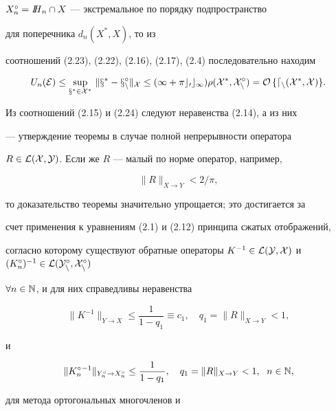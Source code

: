 $X_n^\circ =\text{\it I\/}\hspace{-1.25mm}\text{\it H\/}_n\cap X$ --- экстремальное по порядку подпространство


для поперечника $d_n(X^*,X)$, то из


соотношений (2.23), (2.22), (2.16), (2.17), (2.4) последовательно находим


\begin{equation}


U_n(\cal E)\leq \sup_{x^*\in X^*}\, \|x^*-x_n^\circ\|_X \leq


(1+\pi c_0c_1)\rho(X^*,X_n^\circ )=


O\, \{ d_n(X^*,X)\}.


\end{equation}





Из соотношений (2.15) и (2.24) следуют неравенства (2.14), а из них


--- утверждение теоремы в случае полной непрерывности оператора


$R\in \cal L(X,Y)$. Если же $R$ --- малый по норме оператор, например,


$$


\|R\|_{X\rightarrow Y}<2/\pi ,


$$


то доказательство теоремы значительно упрощается; это достигается за


счет применения к уравнениям (2.1) и (2.12) принципа сжатых отображений,


согласно которому существуют обратные операторы $K^{-1}


\in \cal L(Y,X)$ и $(K_n^\circ )^{-1}\in \cal L


(Y_n^\circ ,X_n^\circ)$


$\forall n\in \Bbb N$, и для них справедливы неравенства


$$


\|K^{-1}\|_{Y\rightarrow X}\leq\frac{1}{1-q_1}\equiv c_1,\quad


q_1=\|R\|_{X\rightarrow Y}<1 ,


$$


и


$$


\|K_n^\circ {}^{-1}\|_{Y_n^\circ\rightarrow X_n^\circ}\leq


\frac{1}{1-q_1},\quad


q_1=\|R\|_{X\rightarrow Y}<1,\ \; n\in \Bbb N,


$$


для метода ортогональных многочленов и


